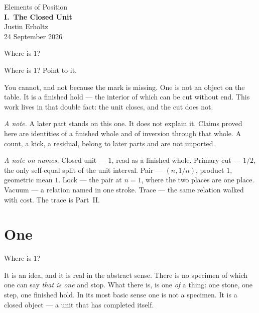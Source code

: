 \documentclass[10pt,a4paper]{article}
\theoremstyle{plain}
\theoremstyle{definition}
\theoremstyle{remark}
\begin{document}
\begin{center}
\vspace*{2.0em}
{\large Elements of Position}\\[1.5em]
{\LARGE\bfseries I.\ The Closed Unit}\\[2.0em]
{\normalsize Justin Erholtz}\\[0.3em]
{\small 24 September 2026}
\end{center}

\vspace{1.8em}

\begin{center}
{\large Where is \(1\)?}
\end{center}

\vspace{1.4em}

\noindent
Where is \(1\)? Point to it.

You cannot, and not because the mark is missing.
One is not an object on the table.
It is a finished hold --- the interior of which can be cut without end.
This work lives in that double fact: the unit closes, and the cut does not.

\vspace{1.0em}
\noindent
\textit{A note.}
A later part stands on this one.
It does not explain it.
Claims proved here are identities of a finished whole and of inversion through that whole.
A count, a kick, a residual, belong to later parts and are not imported.

\vspace{0.6em}
\noindent
\textit{A note on names.}
Closed unit --- \(1\), read as a finished whole.
Primary cut --- \(1/2\), the only self-equal split of the unit interval.
Pair --- \((n,1/n)\), product \(1\), geometric mean \(1\).
Lock --- the pair at \(n=1\), where the two places are one place.
Vacuum --- a relation named in one stroke.
Trace --- the same relation walked with cost.
The trace is Part~II.

\newpage
\tableofcontents
\newpage

\section{One}

Where is \(1\)?

It is an idea, and it is real in the abstract sense.
There is no specimen of which one can say \emph{that is one} and stop.
What there is, is one \emph{of} a thing: one stone, one step, one finished hold.
In its most basic sense one is not a specimen.
It is a closed object --- a unit that has completed itself.
\end{document}
